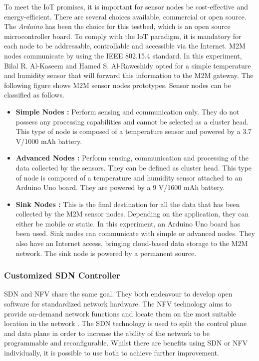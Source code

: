 \documentclass[10pt,journal,compsoc]{IEEEtran}
\begin{document}
To meet the IoT promises, it is important for sensor nodes be 
cost-effective and energy-efficient. There are several choices available, 
commercial or open source. The \textit{Arduino} \cite{arduino} has been 
the choice for this testbed, which is an open source microcontroller board. 
To comply with the IoT paradigm, it is mandatory for each node to be 
addressable, controllable and accessible via the Internet. M2M nodes 
communicate by using the IEEE 802.15.4 standard. In this 
experiment, Bilal R. Al-Kaseem and Hamed S. Al-Raweshidy \cite{main} 
opted for a simple temperature and humidity sensor that will forward this 
information to the M2M gateway. The following figure shows M2M sensor 
nodes prototypes. Sensor nodes can be classified as follows.
\begin{itemize}
    \item \textbf{Simple Nodes :} Perform sensing and communication only. 
    They do not possess any processing capabilities and cannot be 
    selected as a cluster head. This type of node is composed of a 
    temperature sensor and powered by a 3.7 V/1000 mAh battery. 
    \item \textbf{Advanced Nodes :} Perform sensing, communication and 
    processing of the data collected by the sensors. They can be 
    defined as cluster head. This type of node is composed of a 
    temperature and humidity sensor attached to an Arduino Uno board. 
    They are powered by a 9 V/1600 mAh battery.
    \item \textbf{Sink Nodes :} This is the final destination for all the 
    data that has been collected by the M2M sensor nodes. Depending 
    on the application, they can either be mobile or static. In this 
    experiment, an Arduino Uno board has been used. Sink nodes can 
    communicate with simple or advanced nodes. They also have an 
    Internet access, bringing cloud-based data storage to the M2M 
    network. The sink node is powered by a permanent source.
\end{itemize}

\subsubsection{Customized SDN Controller}

SDN and NFV share the same goal. They both endeavour to develop open 
software for standardized network hardware. The NFV technology aims to 
provide on-demand network functions and locate them on the most 
suitable location in the network \cite{batalle}. 
The SDN technology is used to split the control plane and data plane 
in order to increase the ability of the network to be programmable 
and reconfigurable. Whilst there are benefits using SDN or NFV 
individually, it is possible to use both to achieve further improvement. 
\end{document}
